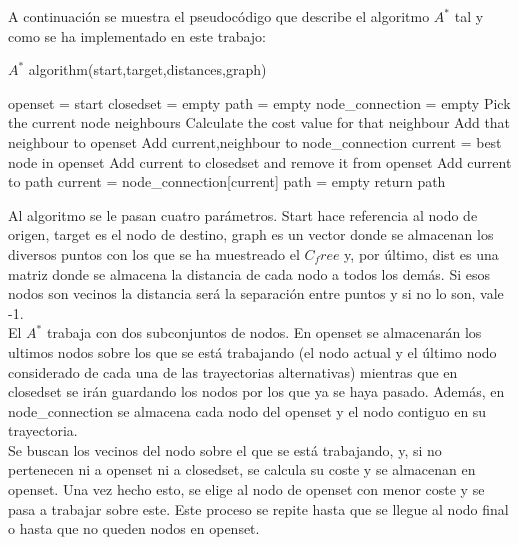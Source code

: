 A continuación se muestra el pseudocódigo que describe el algoritmo $A^*$ tal y como se ha implementado en este trabajo:\\

\begin{algorithm}
\caption{$A^*$ algorithm(start,target,distances,graph)}\label{A_algorithm}
\begin{algorithmic}[1]
\State openset = start
\State closedset = empty
\State path = empty
\State node_connection = empty
 \State Pick the current node neighbours
 \State Calculate the cost value for that neighbour
 \State Add that neighbour to openset
 \State Add current,neighbour to node_connection
\EndFor
\State current = best node in openset
\State Add current to closedset and remove it from openset
\EndWhile
{}
\State Add current to path
\State current = node_connection[current]
\EndWhile
\Else
\State path = empty
\EndIf
\State return path
\end{algorithmic}
\end{algorithm}  

Al algoritmo se le pasan cuatro parámetros. Start hace referencia al nodo de origen, target es el nodo de destino, graph es un vector donde se almacenan los diversos puntos con los que se ha muestreado el $C_free$ y, por último, dist es una matriz donde se almacena la distancia de cada nodo a todos los demás. Si esos nodos son vecinos la distancia será la separación entre puntos y si no lo son, vale -1.\\

El $A^*$ trabaja con dos subconjuntos de nodos. En openset se almacenarán los ultimos nodos sobre los que se está trabajando (el nodo actual y el último nodo considerado de cada una de las trayectorias alternativas) mientras que en closedset se irán guardando los nodos por los que ya se haya pasado. Además, en node_connection se almacena cada nodo del openset y el nodo contiguo en su trayectoria.\\

Se buscan los vecinos del nodo sobre el que se está trabajando, y, si no pertenecen ni a openset ni a closedset, se calcula su coste y se almacenan en openset. Una vez hecho esto, se elige al nodo de openset con menor coste y se pasa a trabajar sobre este. Este proceso se repite hasta que se llegue al nodo final o hasta que no queden nodos en openset.\\

